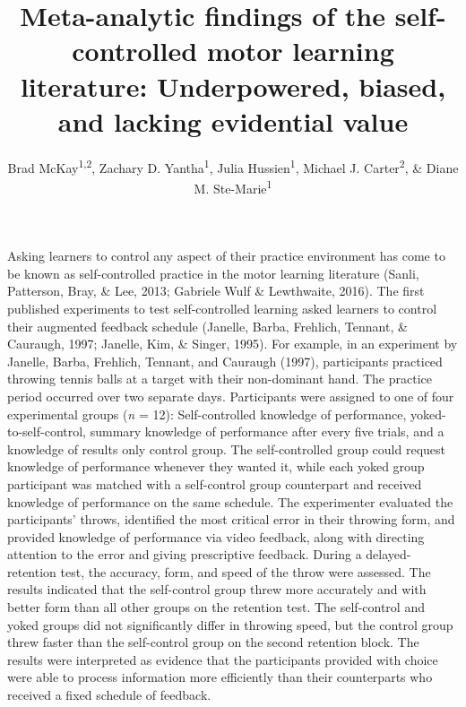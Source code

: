 \documentclass[
  english,
  man,floatsintext]{apa7}
\title{Meta-analytic findings of the self-controlled motor learning literature: Underpowered, biased, and lacking evidential value}
\author{Brad McKay\textsuperscript{1,2}, Zachary D. Yantha\textsuperscript{1}, Julia Hussien\textsuperscript{1}, Michael J. Carter\textsuperscript{2}, \& Diane M. Ste-Marie\textsuperscript{1}}
\date{}
\affiliation{\vspace{0.5cm}\textsuperscript{1} School of Human Kinetics, University of Ottawa\\\textsuperscript{2} Department of Kinesiology, McMaster University}
\begin{document}
\maketitle

Asking learners to control any aspect of their practice environment has come to be known as self-controlled practice in the motor learning literature (Sanli, Patterson, Bray, \& Lee, 2013; Gabriele Wulf \& Lewthwaite, 2016). The first published experiments to test self-controlled learning asked learners to control their augmented feedback schedule (Janelle, Barba, Frehlich, Tennant, \& Cauraugh, 1997; Janelle, Kim, \& Singer, 1995). For example, in an experiment by Janelle, Barba, Frehlich, Tennant, and Cauraugh (1997), participants practiced throwing tennis balls at a target with their non-dominant hand. The practice period occurred over two separate days. Participants were assigned to one of four experimental groups (\emph{n} = 12): Self-controlled knowledge of performance, yoked-to-self-control, summary knowledge of performance after every five trials, and a knowledge of results only control group. The self-controlled group could request knowledge of performance whenever they wanted it, while each yoked group participant was matched with a self-control group counterpart and received knowledge of performance on the same schedule. The experimenter evaluated the participants' throws, identified the most critical error in their throwing form, and provided knowledge of performance via video feedback, along with directing attention to the error and giving prescriptive feedback. During a delayed-retention test, the accuracy, form, and speed of the throw were assessed. The results indicated that the self-control group threw more accurately and with better form than all other groups on the retention test. The self-control and yoked groups did not significantly differ in throwing speed, but the control group threw faster than the self-control group on the second retention block. The results were interpreted as evidence that the participants provided with choice were able to process information more efficiently than their counterparts who received a fixed schedule of feedback.
\end{document}
